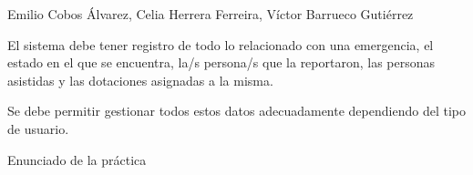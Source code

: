 {Emilio Cobos Álvarez, Celia Herrera Ferreira, Víctor Barrueco Gutiérrez}
{El sistema debe tener registro de todo lo relacionado con una emergencia, el estado en el que se encuentra, la/s persona/s que la reportaron, las personas asistidas y las dotaciones asignadas a la misma. \par
Se debe permitir gestionar todos estos datos adecuadamente dependiendo del tipo de usuario.}
{}
{Enunciado de la práctica}

